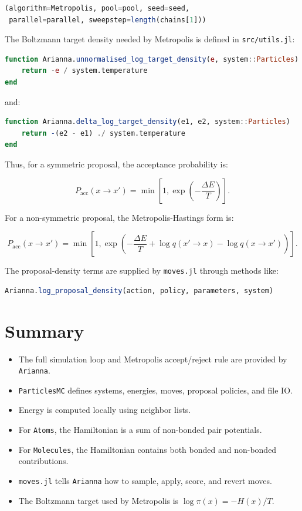 \documentclass[11pt]{article}
\begin{document}
\begin{lstlisting}[language=Julia]
(algorithm=Metropolis, pool=pool, seed=seed,
 parallel=parallel, sweepstep=length(chains[1]))
\end{lstlisting}

The Boltzmann target density needed by Metropolis is defined in
\texttt{src/utils.jl}:

\begin{lstlisting}[language=Julia]
function Arianna.unnormalised_log_target_density(e, system::Particles)
    return -e / system.temperature
end
\end{lstlisting}

and:

\begin{lstlisting}[language=Julia]
function Arianna.delta_log_target_density(e1, e2, system::Particles)
    return -(e2 - e1) ./ system.temperature
end
\end{lstlisting}

Thus, for a symmetric proposal, the acceptance probability is:

\begin{equation}
P_{\mathrm{acc}}(x\to x')
=
\min\left[1,\exp\left(-\frac{\Delta E}{T}\right)\right].
\end{equation}

For a non-symmetric proposal, the Metropolis-Hastings form is:

\begin{equation}
P_{\mathrm{acc}}(x\to x')
=
\min\left[
1,
\exp\left(
-\frac{\Delta E}{T}
+
\log q(x'\to x)
-
\log q(x\to x')
\right)
\right].
\end{equation}

The proposal-density terms are supplied by \texttt{moves.jl} through methods
like:

\begin{lstlisting}[language=Julia]
Arianna.log_proposal_density(action, policy, parameters, system)
\end{lstlisting}

\section{Summary}

\begin{itemize}
  \item The full simulation loop and Metropolis accept/reject rule are provided
  by \texttt{Arianna}.
  \item \texttt{ParticlesMC} defines systems, energies, moves, proposal policies,
  and file IO.
  \item Energy is computed locally using neighbor lists.
  \item For \texttt{Atoms}, the Hamiltonian is a sum of non-bonded pair
  potentials.
  \item For \texttt{Molecules}, the Hamiltonian contains both bonded and
  non-bonded contributions.
  \item \texttt{moves.jl} tells \texttt{Arianna} how to sample, apply, score, and
  revert moves.
  \item The Boltzmann target used by Metropolis is \(\log \pi(x) = -H(x)/T\).
\end{itemize}
\end{document}
